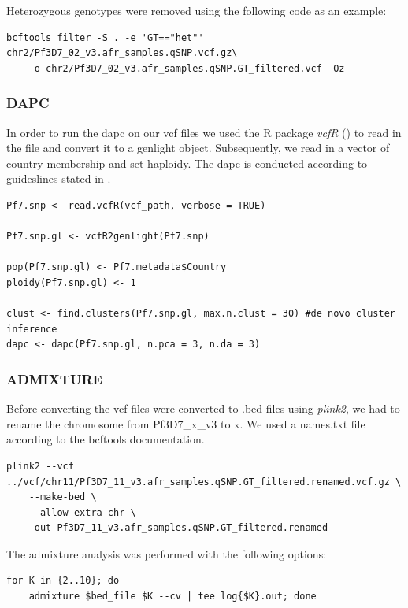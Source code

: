 \documentclass[11pt]{article}
\begin{document}
Heterozygous genotypes were removed using the following code as an example:
\begin{verbatim}
bcftools filter -S . -e 'GT=="het"' chr2/Pf3D7_02_v3.afr_samples.qSNP.vcf.gz\
    -o chr2/Pf3D7_02_v3.afr_samples.qSNP.GT_filtered.vcf -Oz
\end{verbatim}

\subsubsection*{DAPC}
\label{sec:orgce3ec9e}
In order to run the dapc on our vcf files we used the R package \emph{vcfR} (\cite{knaus-2017-vcfr}) to read in the file and convert it to a genlight object. Subsequently, we read in a vector of country membership and set haploidy. The dapc is conducted according to guideslines stated in \cite{thia-2022-guidel-stand}.

\begin{verbatim}
Pf7.snp <- read.vcfR(vcf_path, verbose = TRUE)

Pf7.snp.gl <- vcfR2genlight(Pf7.snp)

pop(Pf7.snp.gl) <- Pf7.metadata$Country
ploidy(Pf7.snp.gl) <- 1

clust <- find.clusters(Pf7.snp.gl, max.n.clust = 30) #de novo cluster inference
dapc <- dapc(Pf7.snp.gl, n.pca = 3, n.da = 3)
\end{verbatim}
\subsubsection*{ADMIXTURE}
\label{sec:org1f25b44}
Before converting the vcf files were converted to .bed files using \emph{plink2}, we had to rename the chromosome from Pf3D7\_x\_v3 to x. We used a names.txt file according to the bcftools documentation.

\begin{verbatim}
plink2 --vcf ../vcf/chr11/Pf3D7_11_v3.afr_samples.qSNP.GT_filtered.renamed.vcf.gz \
    --make-bed \
    --allow-extra-chr \
    -out Pf3D7_11_v3.afr_samples.qSNP.GT_filtered.renamed
\end{verbatim}

The admixture analysis was performed with the following options:
\begin{verbatim}
for K in {2..10}; do
    admixture $bed_file $K --cv | tee log{$K}.out; done
\end{verbatim}
\end{document}
